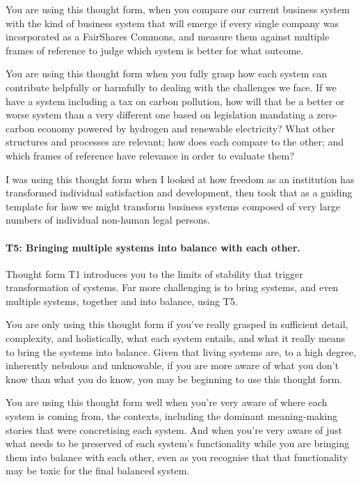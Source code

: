 You are using this thought form, when you compare our current business system with the kind of business system that will emerge if every single company was incorporated as a FairShares Commons,  and measure them against multiple frames of reference  to judge which system is better for what outcome.


You are using this thought form when you fully grasp how each system can contribute helpfully or harmfully to dealing with the challenges we face. If we have a system including a tax on carbon pollution, how will that be a better or worse system than a very different one based on legislation mandating a zero-carbon economy powered by hydrogen and renewable electricity? What other structures and processes are relevant; how does each compare to the other; and which frames of reference have relevance in order to evaluate them?


I was using this thought form when I looked at how freedom  as an institution has transformed individual satisfaction and development, then took that as a guiding template for how we might transform business systems composed of very large numbers of individual non-human legal persons.


\paragraph{\textbf{T5: Bringing multiple systems into balance with each other.}}
Thought form T1 introduces you to the limits of stability that trigger transformation of systems. Far more challenging is to bring systems, and even multiple systems, together and into balance, using T5.


You are only using this thought form if you've really grasped in sufficient detail, complexity, and holistically, what each system entails, and what it really means to bring the systems into balance. Given that living systems are, to a high degree, inherently nebulous and unknowable, if you are more aware of what you don't know than what you do know, you may be beginning to use this thought form.


You are using this thought form well when you're very aware of where each system is coming from, the contexts, including the dominant meaning-making stories that were concretising each system. And when you’re very aware of just what needs to be preserved of each system’s functionality while you are bringing them into balance with each other, even as you recognise that that functionality may be toxic for the final balanced system.


